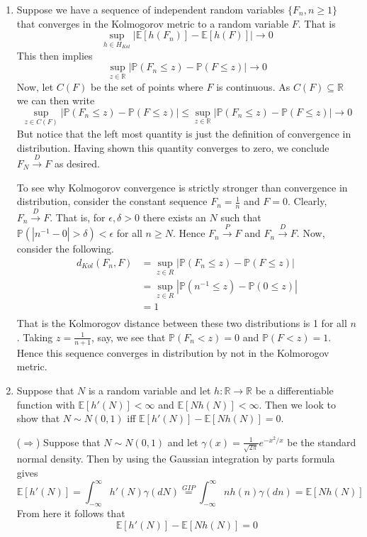 \documentclass[12pt]{article}  %
\newcommand{\R}{{\mathbb{R}}}
\newcommand{\e}{{\epsilon}}
\newcommand{\E}{{\mathbb{E}}}
\newcommand{\prob}{{\mathbb{P}}}
\begin{document}
\begin{enumerate}
\item Suppose we have a sequence of independent random variables $\{F_n, n\geq 1\}$ that converges in the Kolmogorov metric to a random variable $F$. That is $$\sup_{h\in H_{Kol}}|\E[h(F_n)] - \E[h(F)]| \to 0$$ This then implies 
$$\sup_{z\in\R}|\prob(F_n\leq z) - \prob(F\leq z)| \to 0$$ Now, let $C(F)$ be the set of points where $F$ is continuous. As $C(F)\subseteq\R$ we can then write $$\sup_{z\in C(F)}|\prob(F_n\leq z) - \prob(F\leq z)|\leq \sup_{z\in\R}|\prob(F_n\leq z) - \prob(F\leq z)| \to 0$$ But notice that the left most quantity is just the definition of convergence in distribution. Having shown this quantity converges to zero, we conclude $F_N\overset{D}{\to} F$ as desired. 

To see why Kolmogorov convergence is strictly stronger than convergence in distribution, consider the constant sequence $F_n = \frac{1}{n}$ and $F = 0$. Clearly, $F_n\overset{D}{\to} F$. That is, for $\e, \delta>0$ there exists an $N$ such that $\prob(|n^{-1}-0|>\delta)<\e$ for all $n\geq N$. Hence $F_n\overset{P}{\to}F$ and $F_n\overset{D}{\to}F$. Now, consider the following.
\begin{align*}
d_{Kol}(F_n, F) &= \sup_{z\in R}|\prob(F_n\leq z) - \prob(F\leq z)|\\
&= \sup_{z\in R}|\prob(n^{-1}\leq z) - \prob(0\leq z)|\\
&= 1\\
\end{align*}
That is the Kolmorogov distance between these two distributions is 1 for all $n$. Taking $z = \frac{1}{n+1}$, say, we see that $\prob(F_n<z) = 0$ and $\prob(F<z) = 1$. Hence this sequence converges in distribution by not in the Kolmorogov metric. 


\item Suppose that $N$ is a random variable and let $h:\R\to\R$ be a differentiable function with $\E[h'(N)]<\infty$ and $\E[Nh(N)]<\infty$. Then we look to show that $N\sim N(0,1)$ iff $\E[h'(N)] - \E[Nh(N)] = 0$. 

($\Longrightarrow$) Suppose that $N\sim N(0,1)$ and let $\gamma(x) = \frac{1}{\sqrt{2\pi}}e^{-x^2/x}$ be the standard normal density. Then by using the Gaussian integration by parts formula gives $$\E[h'(N)] = \int_{-\infty}^{\infty}h'(N)\gamma(dN) \overset{GIP}{=} \int_{-\infty}^{\infty} nh(n)\gamma(dn) = \E[Nh(N)]$$ From here it follows that $$\E[h'(N)] - \E[Nh(N)] = 0$$


\end{enumerate}
\end{document}
